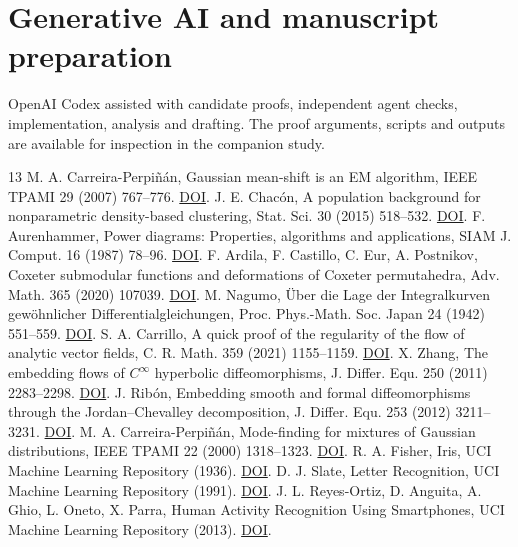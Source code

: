\documentclass[final,5p,twocolumn]{elsarticle}
\begin{document}
\section*{Generative AI and manuscript preparation}
OpenAI Codex assisted with candidate proofs, independent agent checks,
implementation, analysis and drafting. The proof arguments, scripts
and outputs are available for inspection in the companion study.

\begin{thebibliography}{13}
 M. A. Carreira-Perpi\~n\'an, Gaussian mean-shift is an EM algorithm, IEEE TPAMI 29 (2007) 767--776. \href{https://doi.org/10.1109/TPAMI.2007.1057}{DOI}.
 J. E. Chac\'on, A population background for nonparametric density-based clustering, Stat. Sci. 30 (2015) 518--532. \href{https://doi.org/10.1214/15-STS526}{DOI}.
 F. Aurenhammer, Power diagrams: Properties, algorithms and applications, SIAM J. Comput. 16 (1987) 78--96. \href{https://doi.org/10.1137/0216006}{DOI}.
 F. Ardila, F. Castillo, C. Eur, A. Postnikov, Coxeter submodular functions and deformations of Coxeter permutahedra, Adv. Math. 365 (2020) 107039. \href{https://doi.org/10.1016/j.aim.2020.107039}{DOI}.
 M. Nagumo, \"Uber die Lage der Integralkurven gew\"ohnlicher Differentialgleichungen, Proc. Phys.-Math. Soc. Japan 24 (1942) 551--559. \href{https://doi.org/10.11429/ppmsj1919.24.0_551}{DOI}.
 S. A. Carrillo, A quick proof of the regularity of the flow of analytic vector fields, C. R. Math. 359 (2021) 1155--1159. \href{https://doi.org/10.5802/crmath.271}{DOI}.
 X. Zhang, The embedding flows of $C^\infty$ hyperbolic diffeomorphisms, J. Differ. Equ. 250 (2011) 2283--2298. \href{https://doi.org/10.1016/j.jde.2010.12.022}{DOI}.
 J. Rib\'on, Embedding smooth and formal diffeomorphisms through the Jordan--Chevalley decomposition, J. Differ. Equ. 253 (2012) 3211--3231. \href{https://doi.org/10.1016/j.jde.2012.09.009}{DOI}.
 M. A. Carreira-Perpi\~n\'an, Mode-finding for mixtures of Gaussian distributions, IEEE TPAMI 22 (2000) 1318--1323. \href{https://doi.org/10.1109/34.888716}{DOI}.
 R. A. Fisher, Iris, UCI Machine Learning Repository (1936). \href{https://doi.org/10.24432/C56C76}{DOI}.
 D. J. Slate, Letter Recognition, UCI Machine Learning Repository (1991). \href{https://doi.org/10.24432/C5ZP40}{DOI}.
 J. L. Reyes-Ortiz, D. Anguita, A. Ghio, L. Oneto, X. Parra, Human Activity Recognition Using Smartphones, UCI Machine Learning Repository (2013). \href{https://doi.org/10.24432/C54S4K}{DOI}.
\end{thebibliography}
\end{document}
